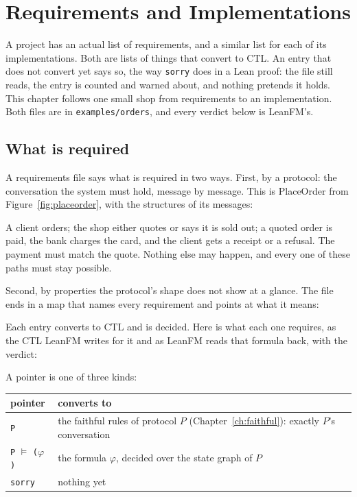 \chapter{Requirements and Implementations}\label{ch:lists}

A project has an actual list of requirements, and a similar list for each of its
implementations. Both are lists of things that convert to CTL. An entry that does not
convert yet says so, the way \texttt{sorry} does in a Lean proof: the file still reads,
the entry is counted and warned about, and nothing pretends it holds.
This chapter follows one small shop from requirements to an implementation. Both files
are in \texttt{examples/orders}, and every verdict below is LeanFM's.

\section{What is required}

A requirements file says what is required in two ways. First, by a protocol: the
conversation the system must hold, message by message. This is PlaceOrder from
Figure~\ref{fig:placeorder}, with the structures of its messages:



A client orders; the shop either quotes or says it is sold out; a quoted order is paid,
the bank charges the card, and the client gets a receipt or a refusal. The payment must
match the quote. Nothing else may happen, and every one of these paths must stay possible.

Second, by properties the protocol's shape does not show at a glance. The file ends in a
map that names every requirement and points at what it means:



Each entry converts to CTL and is decided. Here is what each one requires, as the CTL
LeanFM writes for it and as LeanFM reads that formula back, with the verdict:


A pointer is one of three kinds:

\begin{center}
\begin{tabular}{@{}lp{}@{}}
\toprule
pointer & converts to \\
\midrule
\texttt{P} & the faithful rules of protocol $P$ (Chapter~\ref{ch:faithful}): exactly $P$'s conversation \\
\texttt{P} $\models$ \texttt{($\varphi$)} & the formula $\varphi$, decided over the state graph of $P$ \\
\texttt{sorry} & nothing yet \\
\bottomrule
\end{tabular}
\end{center}

